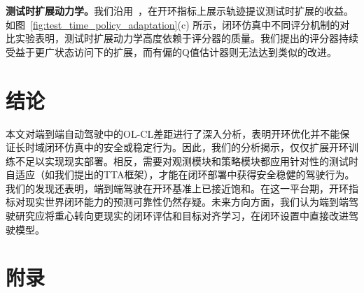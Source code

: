 \documentclass{article}
\begin{document}
\textbf{测试时扩展动力学。}我们沿用~\cite{diffusiondrive, diffusiondrivev2, li2025ztrs, yao2026drivesuprim}，在开环指标上展示轨迹提议测试时扩展的收益。如图~\ref{fig:test_time_policy_adaptation}(c) 所示，闭环仿真中不同评分机制的对比实验表明，测试时扩展动力学高度依赖于评分器的质量。我们提出的评分器持续受益于更广状态访问下的扩展，而有偏的Q值估计器则无法达到类似的改进。

\section{结论}
本文对端到端自动驾驶中的OL-CL差距进行了深入分析，表明开环优化并不能保证长时域闭环仿真中的安全或稳定行为。因此，我们的分析揭示，仅仅扩展开环训练不足以实现现实部署。相反，需要对观测模块和策略模块都应用针对性的测试时自适应（如我们提出的TTA框架），才能在闭环部署中获得安全稳健的驾驶行为。我们的发现还表明，端到端驾驶在开环基准上已接近饱和。在这一平台期，开环指标对现实世界闭环能力的预测可靠性仍然存疑。未来方向方面，我们认为端到端驾驶研究应将重心转向更现实的闭环评估和目标对齐学习，在闭环设置中直接改进驾驶模型。


\clearpage


\newpage
\appendix

\section*{附录}
\end{document}
